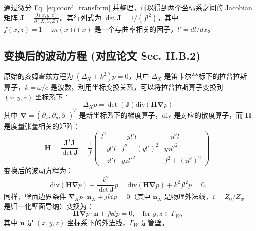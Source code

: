 \documentclass{ctexart}
\begin{document}
通过微分 Eq. \eqref{eq:coord_transform} 并整理，可以得到两个坐标系之间的 Jacobian 矩阵 $\mathbf{J} = \frac{\partial (x, y, z)}{\partial (X, Y, Z)}$。其行列式为 $\det \mathbf{J} = 1/(fl^2)$，其中 $f(x, z) = 1 - z \kappa(x) l(x)$ 是一个与曲率相关的因子，$l' = dl/dx$。

\subsection{变换后的波动方程 (对应论文 Sec. II.B.2)}
原始的亥姆霍兹方程为 $(\Delta_X + k^2)p = 0$，其中 $\Delta_X$ 是笛卡尔坐标下的拉普拉斯算子，$k = \omega/c$ 是波数。利用坐标变换关系，可以将拉普拉斯算子变换到 $(x,y,z)$ 坐标系下：
\[
\Delta_X p = \det(\mathbf{J}) \text{div}(\mathbf{H} \boldsymbol{\nabla} p)
\]
其中 $\boldsymbol{\nabla} = (\partial_x, \partial_y, \partial_z)^T$ 是新坐标系下的梯度算子，$\text{div}$ 是对应的散度算子，而 $\mathbf{H}$ 是度量张量相关的矩阵：
\begin{equation} \label{eq:H_matrix}
\mathbf{H} = \frac{\mathbf{J}^T \mathbf{J}}{\det \mathbf{J}} = \frac{1}{f}
\begin{pmatrix}
l^2 & -yl'l & -zl'l \\
-yl'l & f^2 + (yl')^2 & yzl'^2 \\
-zl'l & yzl'^2 & f^2 + (zl')^2
\end{pmatrix}.
\end{equation}
变换后的波动方程为：
\begin{equation} \label{eq:wave_transformed}
\text{div}(\mathbf{H} \boldsymbol{\nabla} p) + \frac{k^2}{\det \mathbf{J}}p = \text{div}(\mathbf{H} \boldsymbol{\nabla} p) + k^2 f l^2 p = 0.
\end{equation}
同样，壁面边界条件 $\boldsymbol{\nabla}_X p \cdot \mathbf{n}_X + jk\zeta p = 0$（其中 $\mathbf{n}_X$ 是物理外法线，$\zeta = Z_0/Z_w$ 是归一化壁面导纳）变换为：
\begin{equation} \label{eq:bc_transformed}
\mathbf{H} \boldsymbol{\nabla} p \cdot \mathbf{n} + jk\zeta p = 0, \quad \text{for } y,z \in \Gamma_W,
\end{equation}
其中 $\mathbf{n}$ 是 $(x,y,z)$ 坐标系下的外法线，$\Gamma_W$ 是管壁。
\end{document}
